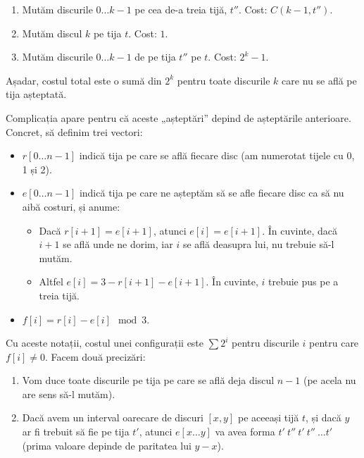 \begin{enumerate}
  \item Mutăm discurile $0 \dots k-1$ pe cea de-a treia tijă, $t''$. Cost: $C(k - 1, t'')$.

  \item Mutăm discul $k$ pe tija $t$. Cost: $1$.

  \item Mutăm discurile $0 \dots k-1$ de pe tija $t''$ pe $t$. Cost: $2^k - 1$.
\end{enumerate}
Așadar, costul total este o sumă din $2^k$ pentru toate discurile $k$ care nu se află pe tija așteptată.

Complicația apare pentru că aceste „așteptări” depind de așteptările anterioare. Concret, să definim trei vectori:

\begin{itemize}
  \item $r[0 \dots n - 1]$ indică tija pe care se află fiecare disc (am numerotat tijele cu 0, 1 și 2).

  \item $e[0 \dots n - 1]$ indică tija pe care ne așteptăm să se afle fiecare disc ca să nu aibă costuri, și anume:

  \begin{itemize}
    \item Dacă $r[i + 1] = e[i + 1]$, atunci $e[i] = e[i + 1]$. În cuvinte, dacă $i+1$ se află unde ne dorim, iar $i$ se află deasupra lui, nu trebuie să-l mutăm.

    \item Altfel $e[i] = 3 - r[i + 1] - e[i + 1]$. În cuvinte, $i$ trebuie pus pe a treia tijă.
  \end{itemize}

  \item $f[i] = r[i] - e[i] \mod 3$.
\end{itemize}

Cu aceste notații, costul unei configurații este $\sum 2^i$ pentru discurile $i$ pentru care $f[i] \neq 0$. Facem două precizări:

\begin{enumerate}
  \item Vom duce toate discurile pe tija pe care se află deja discul $n-1$ (pe acela nu are sens să-l mutăm).

  \item Dacă avem un interval oarecare de discuri $[x, y]$ pe aceeași tijă $t$, și dacă $y$ ar fi trebuit să fie pe tija $t'$, atunci $e[x \dots y]$ va avea forma $t'\ t''\ t'\ t''\ \dots t'$ (prima valoare depinde de paritatea lui $y-x$).
\end{enumerate}

